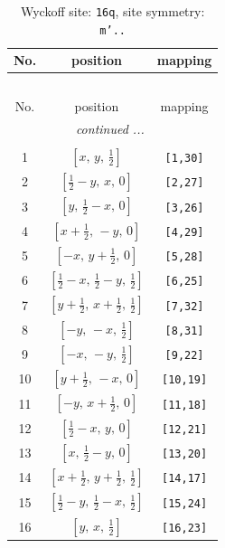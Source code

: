 \documentclass[fleqn,8pt]{jsarticle}
\begin{document}
\renewcommand{\arraystretch}{1.2}
\begin{longtable}{ccc}
\caption{Wyckoff site: {\tt 16q}, site symmetry: {\tt m'..}}
 \\
 \hline \hline
No. & position & mapping \\ \hline \endfirsthead

\multicolumn{2}{l}{\tablename\ \thetable{}} \\
 \hline \hline
No. & position & mapping \\ \hline \endhead

 \hline \hline
\multicolumn{2}{r}{\footnotesize\it continued ...} \\ \endfoot

 \hline \hline
\multicolumn{2}{r}{} \\ \endlastfoot

1 & $\left[ x,\, y,\, \frac{1}{2} \right]$ & {\tt [1,30]} \\ \hline
2 & $\left[ \frac{1}{2} - y,\, x,\, 0 \right]$ & {\tt [2,27]} \\ \hline
3 & $\left[ y,\, \frac{1}{2} - x,\, 0 \right]$ & {\tt [3,26]} \\ \hline
4 & $\left[ x + \frac{1}{2},\, - y,\, 0 \right]$ & {\tt [4,29]} \\ \hline
5 & $\left[ - x,\, y + \frac{1}{2},\, 0 \right]$ & {\tt [5,28]} \\ \hline
6 & $\left[ \frac{1}{2} - x,\, \frac{1}{2} - y,\, \frac{1}{2} \right]$ & {\tt [6,25]} \\ \hline
7 & $\left[ y + \frac{1}{2},\, x + \frac{1}{2},\, \frac{1}{2} \right]$ & {\tt [7,32]} \\ \hline
8 & $\left[ - y,\, - x,\, \frac{1}{2} \right]$ & {\tt [8,31]} \\ \hline
9 & $\left[ - x,\, - y,\, \frac{1}{2} \right]$ & {\tt [9,22]} \\ \hline
10 & $\left[ y + \frac{1}{2},\, - x,\, 0 \right]$ & {\tt [10,19]} \\ \hline
11 & $\left[ - y,\, x + \frac{1}{2},\, 0 \right]$ & {\tt [11,18]} \\ \hline
12 & $\left[ \frac{1}{2} - x,\, y,\, 0 \right]$ & {\tt [12,21]} \\ \hline
13 & $\left[ x,\, \frac{1}{2} - y,\, 0 \right]$ & {\tt [13,20]} \\ \hline
14 & $\left[ x + \frac{1}{2},\, y + \frac{1}{2},\, \frac{1}{2} \right]$ & {\tt [14,17]} \\ \hline
15 & $\left[ \frac{1}{2} - y,\, \frac{1}{2} - x,\, \frac{1}{2} \right]$ & {\tt [15,24]} \\ \hline
16 & $\left[ y,\, x,\, \frac{1}{2} \right]$ & {\tt [16,23]} \\
\end{longtable}
\end{document}
